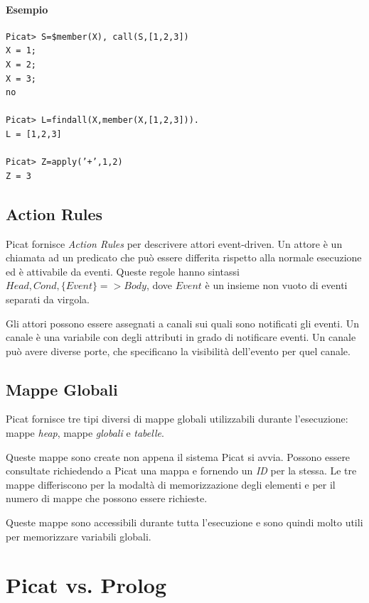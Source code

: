 \documentclass[12pt,a4paper,openright]{book} %
\begin{document}
\paragraph{Esempio}
\begin{verbatim}
Picat> S=$member(X), call(S,[1,2,3])
X = 1;
X = 2;
X = 3;
no

Picat> L=findall(X,member(X,[1,2,3])).
L = [1,2,3]

Picat> Z=apply(’+’,1,2)
Z = 3
\end{verbatim}

\subsection{Action Rules}
\label{subsec:picat_advanced_actionrules}

Picat fornisce \emph{Action Rules} per descrivere attori
event-driven. Un attore è un chiamata ad un predicato che può essere
differita rispetto alla normale esecuzione ed è attivabile da
eventi. Queste regole hanno sintassi $Head, Cond, \{Event\} => Body$,
dove $Event$ è un insieme non vuoto di eventi separati da virgola.

Gli attori possono essere assegnati a canali sui quali sono notificati
gli eventi. Un canale è una variabile con degli attributi in grado di
notificare eventi. Un canale può avere diverse porte, che specificano
la visibilità dell'evento per quel canale.

\subsection{Mappe Globali}
\label{subsec:picat_advanced_globalmaps}

Picat fornisce tre tipi diversi di mappe globali utilizzabili durante
l'esecuzione: mappe \emph{heap}, mappe \emph{globali} e
\emph{tabelle}.

Queste mappe sono create non appena il sistema Picat si avvia. Possono
essere consultate richiedendo a Picat una mappa e fornendo un
\emph{ID} per la stessa. Le tre mappe differiscono per la modaltà di
memorizzazione degli elementi e per il numero di mappe che possono
essere richieste.

Queste mappe sono accessibili durante tutta l'esecuzione e sono quindi
molto utili per memorizzare variabili globali.

\section{Picat vs. Prolog}
\label{sec:picat_picatvsprolog}
\end{document}
